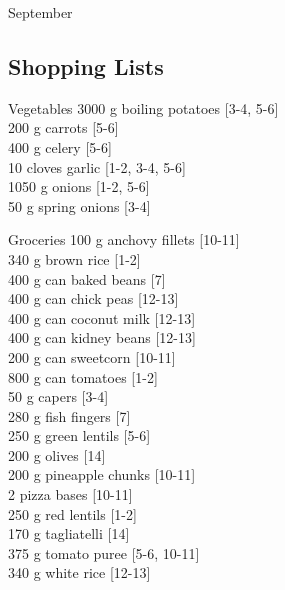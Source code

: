 \begin{menu}{September}
    \subsection*{Shopping Lists}
      \begin{shoppinglist}{Vegetables}
      3000 g boiling potatoes {\scriptsize[3-4, 5-6]}\\
      200 g carrots {\scriptsize[5-6]}\\
      400 g celery {\scriptsize[5-6]}\\
      10 cloves garlic {\scriptsize[1-2, 3-4, 5-6]}\\
      1050 g onions {\scriptsize[1-2, 5-6]}\\
      50 g spring onions {\scriptsize[3-4]}\\
      \end{shoppinglist}%
      \begin{shoppinglist}{Groceries}
      100 g anchovy fillets {\scriptsize[10-11]}\\
      340 g brown rice {\scriptsize[1-2]}\\
      400 g can baked beans {\scriptsize[7]}\\
      400 g can chick peas {\scriptsize[12-13]}\\
      400 g can coconut milk {\scriptsize[12-13]}\\
      400 g can kidney beans {\scriptsize[12-13]}\\
      200 g can sweetcorn {\scriptsize[10-11]}\\
      800 g can tomatoes {\scriptsize[1-2]}\\
      50 g capers {\scriptsize[3-4]}\\
      280 g fish fingers {\scriptsize[7]}\\
      250 g green lentils {\scriptsize[5-6]}\\
      200 g olives {\scriptsize[14]}\\
      200 g pineapple chunks {\scriptsize[10-11]}\\
      2  pizza bases {\scriptsize[10-11]}\\
      250 g red lentils {\scriptsize[1-2]}\\
      170 g tagliatelli {\scriptsize[14]}\\
      375 g tomato puree {\scriptsize[5-6, 10-11]}\\
      340 g white rice {\scriptsize[12-13]}\\
      \end{shoppinglist}%

\end{menu}
